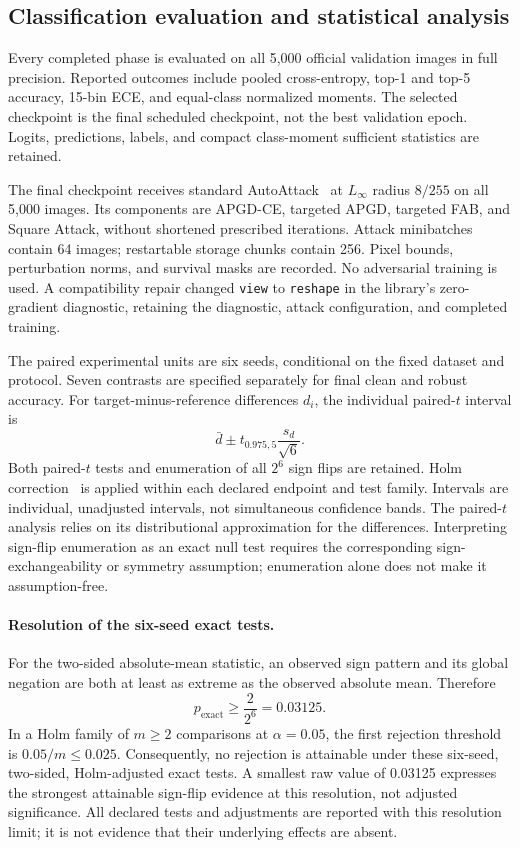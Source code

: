 \documentclass[a4paper,fleqn]{cas-dc}
\begin{document}
\subsection{Classification evaluation and statistical analysis}
\label{sec:statistics}

Every completed phase is evaluated on all 5,000 official
validation images in full precision.
Reported outcomes include pooled cross-entropy, top-1 and top-5
accuracy, 15-bin ECE, and equal-class normalized moments.
The selected checkpoint is the final scheduled checkpoint,
not the best validation epoch.
Logits, predictions, labels, and compact class-moment sufficient
statistics are retained.

The final checkpoint receives standard
AutoAttack~\cite{croce2020autoattack} at $L_\infty$ radius $8/255$
on all 5,000 images.
Its components are APGD-CE, targeted APGD, targeted FAB,
and Square Attack, without shortened prescribed iterations.
Attack minibatches contain 64 images; restartable storage chunks
contain 256. Pixel bounds, perturbation norms, and survival masks
are recorded. No adversarial training is used.
A compatibility repair changed \texttt{view} to \texttt{reshape}
in the library's zero-gradient diagnostic, retaining the diagnostic,
attack configuration, and completed training.

The paired experimental units are six seeds, conditional on the
fixed dataset and protocol.
Seven contrasts are specified separately for final clean and
robust accuracy. For target-minus-reference differences $d_i$,
the individual paired-$t$ interval is
\[
 \bar d\pm t_{0.975,5}\frac{s_d}{\sqrt6}.
\]
Both paired-$t$ tests and enumeration of all $2^6$ sign flips
are retained. Holm correction~\cite{holm1979} is applied within
each declared endpoint and test family.
Intervals are individual, unadjusted intervals, not simultaneous
confidence bands. The paired-$t$ analysis relies on its
distributional approximation for the differences. Interpreting
sign-flip enumeration as an exact null test requires the
corresponding sign-exchangeability or symmetry assumption;
enumeration alone does not make it assumption-free.

\paragraph{Resolution of the six-seed exact tests.}
\label{sec:exact_resolution}
For the two-sided absolute-mean statistic, an observed sign pattern
and its global negation are both at least as extreme as the observed
absolute mean. Therefore
\begin{equation}
 p_{\mathrm{exact}}\ge\frac{2}{2^6}=0.03125.
 \label{eq:exact_resolution}
\end{equation}
In a Holm family of $m\ge2$ comparisons at $\alpha=0.05$,
the first rejection threshold is
$0.05/m\le0.025$.
Consequently, no rejection is attainable under these six-seed,
two-sided, Holm-adjusted exact tests.
A smallest raw value of 0.03125 expresses the strongest attainable
sign-flip evidence at this resolution, not adjusted significance.
All declared tests and adjustments are reported with this resolution
limit; it is not evidence that their underlying effects are absent.
\end{document}
